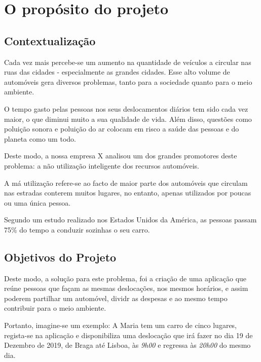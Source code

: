 \chapter{O propósito do projeto}

\section{Contextualização}

\hspace{5mm} Cada vez mais percebe-se um aumento na quantidade de veículos a circular nas ruas das cidades - especialmente as grandes cidades. Esse alto volume de automóveis gera diversos problemas, tanto para a sociedade quanto para o meio ambiente.

\hspace{5mm} O tempo gasto pelas pessoas nos seus deslocamentos diários tem sido cada vez maior, o que diminui muito a sua qualidade de vida. Além disso, questões como poluição sonora e poluição do ar colocam em risco a saúde das pessoas e do planeta como um todo.

\hspace{5mm} Deste modo, a nossa empresa X analisou um dos grandes promotores deste problema: a não utilização inteligente dos recursos automóveis.

\hspace{5mm} A má utilização refere-se ao facto de maior parte dos automóveis que circulam nas estradas conterem muitos lugares, no entanto, apenas utilizados por poucas ou uma única pessoa.

\hspace{5mm} Segundo um estudo realizado nos Estados Unidos da América, as pessoas passam 75\% do tempo a conduzir sozinhas o seu carro.

\section{Objetivos do Projeto}

\hspace{5mm} Deste modo, a solução para este problema, foi a criação de uma aplicação que reúne pessoas que façam as mesmas deslocações, nos mesmos horários, e assim poderem partilhar um automóvel, dividr as despesas e ao mesmo tempo contribuir para o meio ambiente.

\hspace{5mm} Portanto, imagine-se um exemplo: A Maria tem um carro de cinco lugares, regista-se na aplicação e disponibiliza uma deslocação que irá fazer no dia 19 de Dezembro de 2019, de Braga até Lisboa, às \emph{9h00} e regressa às \emph{20h00} do mesmo dia. 


